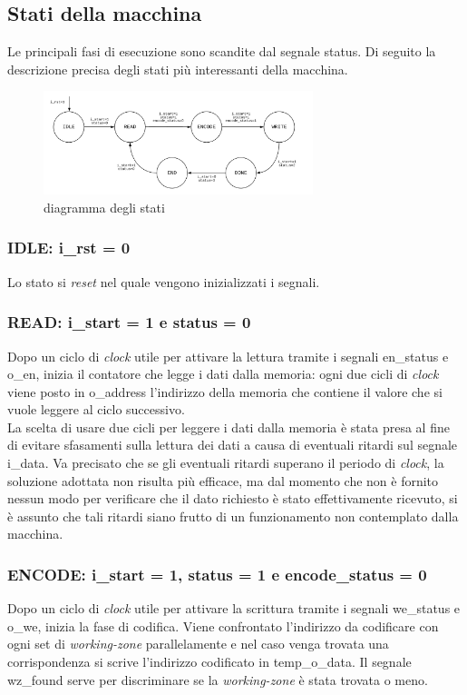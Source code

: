 \documentclass{article}
\begin{document}
\subsection{Stati della macchina}
Le principali fasi di esecuzione sono scandite dal segnale {\selectfont status}. Di seguito la descrizione precisa degli stati più interessanti della macchina.
\begin{figure}[h]
    \centering
    \includegraphics[width=0.7\textwidth]{fsa}
    \caption{diagramma degli stati}
\end{figure}
\subsubsection{IDLE: {\selectfont i\_rst} = 0}
Lo stato si \textit{reset} nel quale vengono inizializzati i segnali.
\subsubsection{READ: {\selectfont i\_start} = 1 e {\selectfont status} = 0}
Dopo un ciclo di \textit{clock} utile per attivare la lettura tramite i segnali {\selectfont en\_status} e {\selectfont o\_en}, inizia il contatore che legge i dati dalla memoria: ogni due cicli di \textit{clock} viene posto in {\selectfont o\_address} l'indirizzo della memoria che contiene il valore che si vuole leggere al ciclo successivo.\\La scelta di usare due cicli per leggere i dati dalla memoria è stata presa al fine di evitare sfasamenti sulla lettura dei dati a causa di eventuali ritardi sul segnale {\selectfont i\_data}. Va precisato che se gli eventuali ritardi superano il periodo di \textit{clock}, la soluzione adottata non risulta più efficace, ma dal momento che non è fornito nessun modo per verificare che il dato richiesto è stato effettivamente ricevuto, si è assunto che tali ritardi siano frutto di un funzionamento non contemplato dalla macchina.
\subsubsection{ENCODE: {\selectfont i\_start} = 1, {\selectfont status} = 1 e {\selectfont encode\_status} = 0}
Dopo un ciclo di \textit{clock} utile per attivare la scrittura tramite i segnali {\selectfont we\_status} e {\selectfont o\_we}, inizia la fase di codifica. Viene confrontato l'indirizzo da codificare con ogni set di \textit{working-zone} parallelamente e nel caso venga trovata una corrispondenza si scrive l'indirizzo codificato in {\selectfont temp\_o\_data}. Il segnale {\selectfont wz\_found} serve per discriminare se la \textit{working-zone} è stata trovata o meno.
\end{document}
